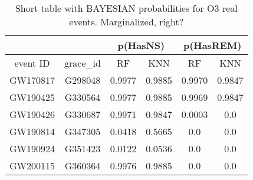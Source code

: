 \begin{table}[]
\begin{tabular}{c|c|cc|cc}
\hline
\multicolumn{1}{c|}{}         & \multicolumn{1}{l|}{} & \multicolumn{2}{c|}{p(HasNS)}                                                & \multicolumn{2}{c}{p(HasREM)}                                                \\ \hline
\multicolumn{1}{c|}{event ID} & grace\_id             & \multicolumn{1}{c}{RF} & \multicolumn{1}{c}{KNN}  & \multicolumn{1}{c}{RF} & \multicolumn{1}{c}{KNN} \\ \hline
GW170817                      & G298048               & 0.9977                   & 0.9885                    & 0.9970                   & 0.9847                                  \\
GW190425                      & G330564               & 0.9977                   & 0.9885                    & 0.9969                   & 0.9847                             \\
GW190426                      & G330687               & 0.9971                   & 0.9847                    & 0.0003                   & 0.0                     \\
GW190814                      & G347305               & 0.0418                   & 0.5665                   & 0.0                  & 0.0                      \\
GW190924                      & G351423               & 0.0122                   & 0.0536                   & 0.0                   & 0.0                       \\               
GW200115                      & G360364               & 0.9976                   & 0.9885                   & 0.0                  & 0.0                           \\
\hline
\end{tabular}
\caption{Short table with BAYESIAN probabilities for O3 real events. Marginalized, right?}
\label{tab:real_data_bayesian}
\end{table}

